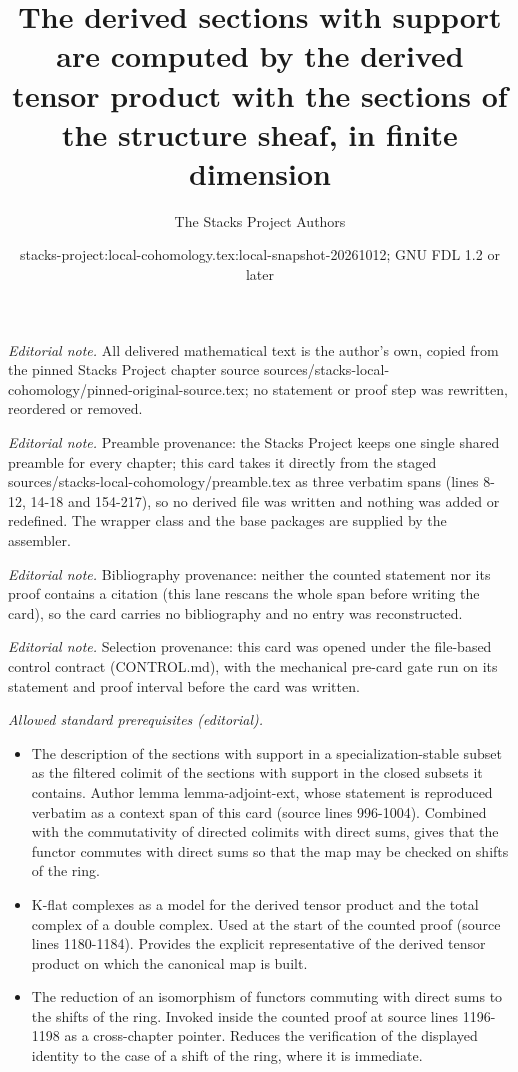 \documentclass[10pt,a4paper]{amsart}
\title{The derived sections with support are computed by the derived tensor product with the sections of the structure sheaf, in finite dimension}
\author{The Stacks Project Authors}
\date{stacks-project:local-cohomology.tex:local-snapshot-20261012; GNU FDL 1.2 or later}
\theoremstyle{plain}
\theoremstyle{definition}
\theoremstyle{remark}
\numberwithin{equation}{subsection}
\begin{document}
\maketitle
\noindent\textit{Editorial note.} All delivered mathematical text is the author's own, copied from the pinned Stacks Project chapter source sources/stacks-local-cohomology/pinned-original-source.tex; no statement or proof step was rewritten, reordered or removed.\par\medskip
\noindent\textit{Editorial note.} Preamble provenance: the Stacks Project keeps one single shared preamble for every chapter; this card takes it directly from the staged sources/stacks-local-cohomology/preamble.tex as three verbatim spans (lines 8-12, 14-18 and 154-217), so no derived file was written and nothing was added or redefined. The wrapper class and the base packages are supplied by the assembler.\par\medskip
\noindent\textit{Editorial note.} Bibliography provenance: neither the counted statement nor its proof contains a citation (this lane rescans the whole span before writing the card), so the card carries no bibliography and no entry was reconstructed.\par\medskip
\noindent\textit{Editorial note.} Selection provenance: this card was opened under the file-based control contract (CONTROL.md), with the mechanical pre-card gate run on its statement and proof interval before the card was written.\par\medskip
\noindent\textit{Allowed standard prerequisites (editorial).}\begin{itemize}
\item The description of the sections with support in a specialization-stable subset as the filtered colimit of the sections with support in the closed subsets it contains. Author lemma lemma-adjoint-ext, whose statement is reproduced verbatim as a context span of this card (source lines 996-1004). Combined with the commutativity of directed colimits with direct sums, gives that the functor commutes with direct sums so that the map may be checked on shifts of the ring.
\item K-flat complexes as a model for the derived tensor product and the total complex of a double complex. Used at the start of the counted proof (source lines 1180-1184). Provides the explicit representative of the derived tensor product on which the canonical map is built.
\item The reduction of an isomorphism of functors commuting with direct sums to the shifts of the ring. Invoked inside the counted proof at source lines 1196-1198 as a cross-chapter pointer. Reduces the verification of the displayed identity to the case of a shift of the ring, where it is immediate.
\end{itemize}\medskip
\end{document}
